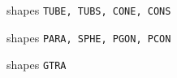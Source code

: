 \newpage
\begin{figure}[hbt]
\vspace{3cm}
      \centering
      \caption{shapes {\tt TUBE, TUBS, CONE, CONS}}
      \label{fg:geom050-2}
\end{figure}
\newpage
\begin{figure}[hbt]
\vspace{3cm}
      \centering
      \caption{shapes {\tt PARA, SPHE, PGON, PCON}}
      \label{fg:geom050-3}
\end{figure}
\newpage
\begin{figure}[hbt]
\vspace{3cm}
      \centering
      \caption{shapes {\tt GTRA}}
      \label{fg:geom050-4}
\end{figure}
